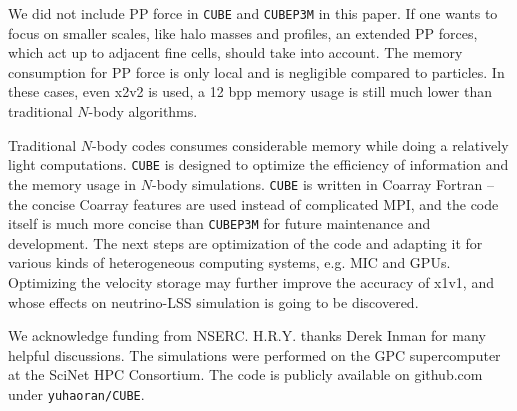 \documentclass[10pt,twocolumn,preprint]{emulateapj}
\begin{document}
We did not include PP force in {\tt CUBE} and {\tt CUBEP3M} in this paper. If one wants to focus on smaller scales, like halo masses and profiles, an extended PP forces, which act up to adjacent fine cells, should take into account. The memory consumption for PP force is only local and is negligible compared to particles. In these cases, even x2v2 is used, a 12 bpp memory usage is still much lower than traditional $N$-body algorithms.

Traditional $N$-body codes consumes considerable memory while doing a relatively light computations. {\tt CUBE} is designed to optimize the efficiency of information and the memory usage in $N$-body simulations. {\tt CUBE} is written in Coarray Fortran -- the concise Coarray features are used instead of complicated MPI, and the code itself is much more concise than {\tt CUBEP3M} for future maintenance and development. The next steps are optimization of the code and adapting it for various kinds of heterogeneous computing systems, e.g. MIC and GPUs. Optimizing the velocity storage may further improve the accuracy of x1v1, and whose effects on neutrino-LSS simulation is going to be discovered.

\acknowledgements
We acknowledge funding from NSERC.
H.R.Y. thanks Derek Inman for many helpful discussions.
The simulations were performed on the GPC supercomputer at the SciNet HPC Consortium.
The code is publicly available on github.com under {\tt yuhaoran/CUBE}.



\end{document}
